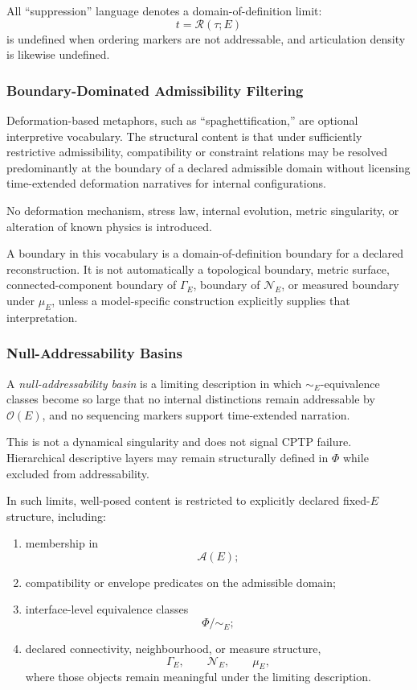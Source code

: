 \documentclass[aps,prx,onecolumn,11pt]{revtex4-2}
\theoremstyle{plain}
\theoremstyle{definition}
\theoremstyle{remark}
\begin{document}
All ``suppression'' language denotes a domain-of-definition limit:
\[
t=\mathcal R(\tau;E)
\]
is undefined when ordering markers are not addressable, and articulation
density is likewise undefined.

\subsubsection{Boundary-Dominated Admissibility Filtering}
\label{appB:boundary_dominated_filtering}

Deformation-based metaphors, such as ``spaghettification,'' are optional
interpretive vocabulary. The structural content is that under
sufficiently restrictive admissibility, compatibility or constraint
relations may be resolved predominantly at the boundary of a declared
admissible domain without licensing time-extended deformation narratives
for internal configurations.

No deformation mechanism, stress law, internal evolution, metric
singularity, or alteration of known physics is introduced.

A boundary in this vocabulary is a domain-of-definition boundary for a
declared reconstruction. It is not automatically a topological boundary,
metric surface, connected-component boundary of \(\Gamma_E\), boundary
of \(\mathcal N_E\), or measured boundary under \(\mu_E\), unless a
model-specific construction explicitly supplies that interpretation.

\subsubsection{Null-Addressability Basins}
\label{appB:null_addressability}

A \emph{null-addressability basin} is a limiting description in which
\(\sim_E\)-equivalence classes become so large that no internal
distinctions remain addressable by \(\mathcal O(E)\), and no sequencing
markers support time-extended narration.

This is not a dynamical singularity and does not signal CPTP failure.
Hierarchical descriptive layers may remain structurally defined in
\(\Phi\) while excluded from addressability.

In such limits, well-posed content is restricted to explicitly declared
fixed-\(E\) structure, including:

\begin{enumerate}[label=(\roman*), leftmargin=2.2em]

\item membership in
\[
\mathcal A(E);
\]

\item compatibility or envelope predicates on the admissible domain;

\item interface-level equivalence classes
\[
\Phi/{\sim_E};
\]

\item declared connectivity, neighbourhood, or measure structure,
\[
\Gamma_E,
\qquad
\mathcal N_E,
\qquad
\mu_E,
\]
where those objects remain meaningful under the limiting description.

\end{enumerate}
\end{document}
